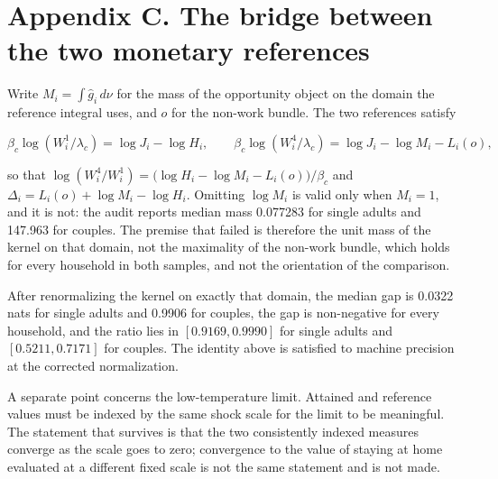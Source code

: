 \section{Appendix C. The bridge between the two monetary references}\label{appendix-c.-the-bridge-between-the-two-monetary-references}

Write \(M_i=\int\widehat g_i\,d\nu\) for the mass of the opportunity object on the domain the reference integral uses, and \(o\) for the non-work bundle. The two references satisfy

\[
\beta_c\log(W^{1}_i/\lambda_c)=\log J_i-\log H_i,
\qquad
\beta_c\log(W^{4}_i/\lambda_c)=\log J_i-\log M_i-L_i(o),
\]

so that \(\log(W^{4}_i/W^{1}_i)=\big(\log H_i-\log M_i-L_i(o)\big)/\beta_c\) and \(\Delta_i=L_i(o)+\log M_i-\log H_i\). Omitting \(\log M_i\) is valid only when \(M_i=1\), and it is not: the audit reports median mass 0.077283 for single adults and 147.963 for couples. The premise that failed is therefore the unit mass of the kernel on that domain, not the maximality of the non-work bundle, which holds for every household in both samples, and not the orientation of the comparison.

After renormalizing the kernel on exactly that domain, the median gap is 0.0322 nats for single adults and 0.9906 for couples, the gap is non-negative for every household, and the ratio lies in \([0.9169, 0.9990]\) for single adults and \([0.5211, 0.7171]\) for couples. The identity above is satisfied to machine precision at the corrected normalization.

A separate point concerns the low-temperature limit. Attained and reference values must be indexed by the same shock scale for the limit to be meaningful. The statement that survives is that the two consistently indexed measures converge as the scale goes to zero; convergence to the value of staying at home evaluated at a different fixed scale is not the same statement and is not made.

